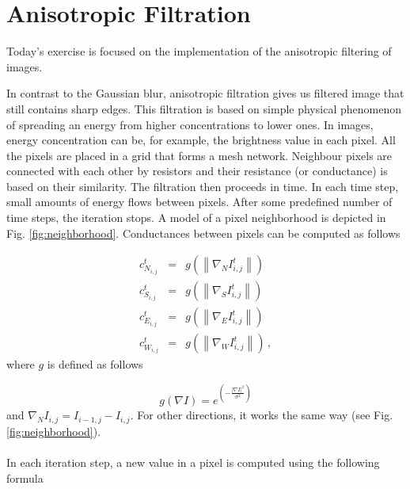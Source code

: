 \documentclass[12pt]{article}
\begin{document}
\section*{Anisotropic Filtration}

\noindent
Today's exercise is focused on the implementation of the anisotropic filtering of images.

\noindent
In contrast to the Gaussian blur, anisotropic filtration gives us filtered image that
still contains sharp edges. This filtration is based on simple physical phenomenon of
spreading an energy from higher concentrations to lower ones. In images, energy concentration
can be, for example, the brightness value in each pixel. All the pixels are placed in a grid
that forms a mesh network. Neighbour pixels are connected with each other by resistors
and their resistance (or conductance) is based on their similarity. The filtration then proceeds
in time. In each time step, small amounts of energy flows between pixels. After some predefined
number of time steps, the iteration stops.
\newline
\newline
\noindent
A model of a pixel neighborhood is depicted in Fig. \ref{fig:neighborhood}.
Conductances between pixels can be computed as follows

\begin{eqnarray} \label{eq:conduct}
    c_{N_{i,j}}^{t} &=& g \left(\left\|\nabla_N I_{i,j}^{t}\right\|\right) \nonumber \\
    c_{S_{i,j}}^{t} &=& g \left(\left\|\nabla_S I_{i,j}^{t}\right\|\right) \nonumber \\
    c_{E_{i,j}}^{t} &=& g \left(\left\|\nabla_E I_{i,j}^{t}\right\|\right) \nonumber \\
    c_{W_{i,j}}^{t} &=& g \left(\left\|\nabla_W I_{i,j}^{t}\right\|\right) \, ,
\end{eqnarray}
where $g$ is defined as follows

\begin{equation}
    g(\nabla I) = e^{\left(-\frac{\left| \nabla I\right|^2}{\sigma^2}\right)}
\end{equation}
and $\nabla_N I_{i,j} = I_{i-1,j} - I_{i,j}$. For other directions, it works the same way (see Fig. \ref{fig:neighborhood}).
\\
\\
\noindent
In each iteration step, a new value in a pixel is computed using the following formula

\end{document}
